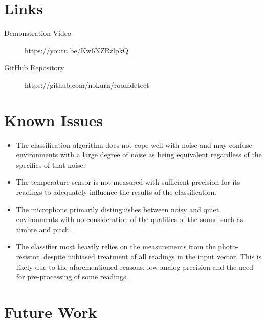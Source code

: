 \documentclass{article}
\begin{document}
\section{Links}

\begin{description}

  \item [Demonstration Video] https://youtu.be/Kw6NZRzlpkQ

  \item [GitHub Repository] https://github.com/nokurn/roomdetect

\end{description}

\section{Known Issues}

\begin{itemize}

  \item The classification algorithm does not cope well with noise and
    may confuse environments with a large degree of noise as being
    equivalent regardless of the specifics of that noise.

  \item The temperature sensor is not measured with sufficient precision
    for its readings to adequately influence the results of the
    classification.

  \item The microphone primarily distinguishes between noisy and quiet
    environments with no consideration of the qualities of the sound
    such as timbre and pitch.

  \item The classifier most heavily relies on the measurements from the
    photo-resistor, despite unbiased treatment of all readings in the
    input vector.  This is likely due to the aforementioned reasons:
    low analog precision and the need for pre-processing of some
    readings.

\end{itemize}

\section{Future Work}
\end{document}
